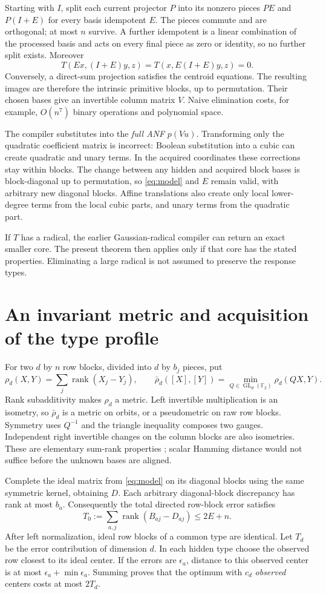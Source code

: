 \documentclass[11pt,a4paper]{article}
\newcommand{\F}{\mathbb F}\newcommand{\Z}{\mathbb Z}
\newcommand{\rank}{\operatorname{rank}}\newcommand{\poly}{\operatorname{poly}}
\newcommand{\GL}{\operatorname{GL}}\newcommand{\ham}{\operatorname{Ham}}
\begin{document}
Starting with $I$, split each current projector $P$ into its nonzero
pieces $PE$ and $P(I+E)$ for every basis idempotent $E$. The
pieces commute and are orthogonal; at most $n$ survive. A further
idempotent is a linear combination of the processed basis and acts
on every final piece as zero or identity, so no further split exists.
Moreover
\[
T(Ex,(I+E)y,z)=T(x,E(I+E)y,z)=0.
\]
Conversely, a direct-sum projection satisfies the centroid equations.
The resulting images are therefore the intrinsic primitive blocks,
up to permutation. Their chosen bases give an invertible column
matrix $V$. Naive elimination costs, for example, $O(n^7)$ binary
operations and polynomial space.

The compiler substitutes into the \emph{full ANF} $p(Vu)$.
Transforming only the quadratic coefficient matrix is incorrect:
Boolean substitution into a cubic can create quadratic and unary
terms. In the acquired coordinates these corrections stay within
blocks. The change between any hidden and acquired block bases is
block-diagonal up to permutation, so \eqref{eq:model} and $E$
remain valid, with arbitrary new diagonal blocks. Affine translations
also create only local lower-degree terms from the local cubic
parts, and unary terms from the quadratic part.

If $T$ has a radical, the earlier Gaussian-radical compiler can
return an exact smaller core. The present theorem then applies only
if that core has the stated properties. Eliminating a large radical
is not assumed to preserve the response types.

\section{An invariant metric and acquisition of the type profile}
\label{sec:metric}
For two $d$ by $n$ row blocks, divided into $d$ by $b_j$ pieces, put
\[
\rho_d(X,Y)=\sum_j\rank(X_j-Y_j),\qquad
\bar\rho_d([X],[Y])=\min_{Q\in\GL_d(\F_2)}\rho_d(QX,Y).
\]
Rank subadditivity makes $\rho_d$ a metric. Left invertible
multiplication is an isometry, so $\bar\rho_d$ is a metric on
orbits, or a pseudometric on raw row blocks. Symmetry uses $Q^{-1}$
and the triangle inequality composes two gauges.
Independent right invertible changes on the column blocks are
also isometries. These are elementary sum-rank properties
\cite{sumrank}; scalar Hamming distance would not suffice before
the unknown bases are aligned.

Complete the ideal matrix from \eqref{eq:model} on its diagonal
blocks using the same symmetric kernel, obtaining $D$.
Each arbitrary diagonal-block discrepancy has rank at most $b_a$.
Consequently the total directed row-block error satisfies
\begin{equation}\label{eq:T}
T_0:=\sum_{a,j}\rank(B_{aj}-D_{aj})\le2E+n.
\end{equation}
After left normalization, ideal row blocks of a common type are
identical. Let $T_d$ be the error contribution of dimension $d$.
In each hidden type choose the observed row closest to its ideal
center. If the errors are $\epsilon_a$, distance to this observed
center is at most $\epsilon_a+\min\epsilon_a$. Summing proves
that the optimum with $c_d$ \emph{observed} centers costs at most
$2T_d$.
\end{document}

